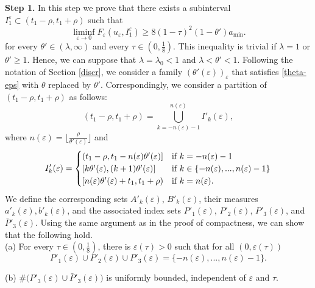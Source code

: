 \documentclass[12pt]{article}
\numberwithin{equation}{section}
\def\e{\varepsilon}
\begin{document}
\smallskip
\noindent\textbf{Step 1.} 
  In this step we prove that there exists a subinterval $I^\e_{1}\subset (t_1-\rho,t_1+\rho)$ such that 
  \begin{equation}\label{first-lb}    \liminf_{\varepsilon\to0}F_{\varepsilon}(u_{\varepsilon},I^\e_1)\ge 8(1-\tau)^{2}(1-\theta')a_{\min}.
 \end{equation}
 for every $\theta'\in(\lambda,\infty)$ and every $\tau\in(0,\frac{1}{8}).$
 This inequality is trivial if $\lambda=1$ or $\theta'\ge 1$. Hence, we can suppose that $\lambda=
\lambda_0<1$ and $\lambda<\theta'<1$. Following the notation of Section \ref{discr}, we consider a family $(\theta'(\varepsilon))_{\e}$ that satisfies \eqref{theta-eps} with $\theta$ replaced by $\theta'$.
Correspondingly, we consider a partition of $(t_1-\rho,t_1+\rho)$ as follows:
 \begin{equation*}
     (t_1-\rho,t_1+\rho)=\bigcup_{k=-n(\varepsilon)-1}^{n(\varepsilon)}I'_{k}(\varepsilon),
 \end{equation*}
 where $n(\varepsilon)=\lfloor\frac{\rho}{\theta'(\e) }\rfloor$ and
 \[
 I'_{k}(\varepsilon)=
 \begin{cases}
   (t_{1}-\rho,t_{1}-n({\varepsilon})\theta'(\e) ] &
   \hbox{if}\,\,k=-n(\varepsilon)-1\\
   [k\theta'(\e) ,(k+1)\theta'(\e) ] & \hbox{if}\,\,k\in\{-n(\varepsilon),...,n(\varepsilon)-1\}\\
   [n(\varepsilon)\theta'(\e) +t_{1},t_{1}+\rho) & \hbox{if}\,\,k=n(\varepsilon).
 \end{cases}
 \]
We define the corresponding sets $A'_{k}(\e)$, $B'_{k}(\e)$, their measures $a'_{k}(\e),b'_{k}(\e)$, and the associated index sets $P'_1(\e)$, $P'_2(\e)$, $P'_3(\e)$, and $\bar P'_3(\e)$. Using the same argument as in the proof of compactness, we can show that the following hold.\\
(a) For every $\tau\in(0,\frac{1}{8})$, there is $\varepsilon(\tau)>0$ such that for all $(0,\varepsilon(\tau))$
\[
P'_{1}(\varepsilon)\cup P'_{2}(\varepsilon)\cup P'_{3}(\varepsilon)=\{-n(\varepsilon),...,n(\varepsilon)-1\}.
\]

\noindent(b) $\#\big(P'_{3}(\varepsilon)\cup \bar{P}'_{3}(\varepsilon)\big)$ is uniformly bounded, independent of $\varepsilon$ and $\tau$.
\end{document}
